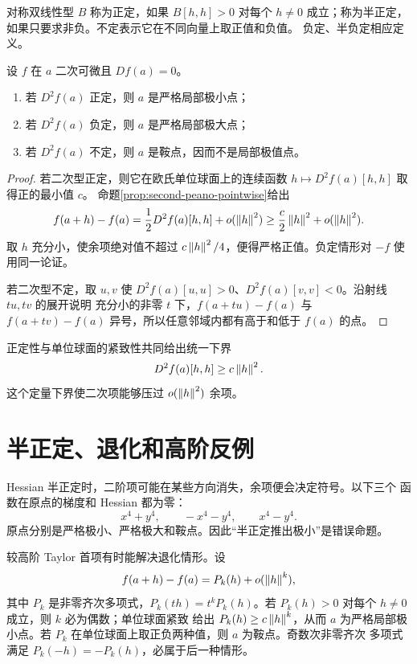 对称双线性型 \(B\) 称为正定，如果 \(B[h,h]>0\) 对每个 \(h\ne0\)
成立；称为半正定，如果只要求非负。不定表示它在不同向量上取正值和负值。
负定、半负定相应定义。

\begin{theorem}[Hessian 判别]
\label{thm:hessian-second-derivative-test}
设 \(f\) 在 \(a\) 二次可微且 \(Df(a)=0\)。
\begin{enumerate}[label=\textup{(\roman*)}]
 \item 若 \(D^2f(a)\) 正定，则 \(a\) 是严格局部极小点；
 \item 若 \(D^2f(a)\) 负定，则 \(a\) 是严格局部极大点；
 \item 若 \(D^2f(a)\) 不定，则 \(a\) 是鞍点，因而不是局部极值点。
\end{enumerate}
\end{theorem}

\begin{proof}
若二次型正定，则它在欧氏单位球面上的连续函数
\(h\mapsto D^2f(a)[h,h]\) 取得正的最小值 \(c\)。
命题\ref{prop:second-peano-pointwise}给出
\[
 f(a+h)-f(a)
 =\frac12D^2f(a)[h,h]+o(\left\lVert h\right\rVert^2)
 \ge\frac c2\left\lVert h\right\rVert^2+o(\left\lVert h\right\rVert^2).
\]
取 \(h\) 充分小，使余项绝对值不超过
\(c\left\lVert h\right\rVert^2/4\)，便得严格正值。负定情形对 \(-f\) 使用同一论证。

若二次型不定，取 \(u,v\) 使
\(D^2f(a)[u,u]>0\)、\(D^2f(a)[v,v]<0\)。沿射线 \(tu,tv\) 的展开说明
充分小的非零 \(t\) 下，\(f(a+tu)-f(a)\) 与
\(f(a+tv)-f(a)\) 异号，所以任意邻域内都有高于和低于 \(f(a)\) 的点。
\end{proof}

正定性与单位球面的紧致性共同给出统一下界
\[
 D^2f(a)[h,h]\ge c\left\lVert h\right\rVert^2.
\]
这个定量下界使二次项能够压过 $o(\left\lVert h\right\rVert^2)$ 余项。

\section{半正定、退化和高阶反例}

Hessian 半正定时，二阶项可能在某些方向消失，余项便会决定符号。以下三个
函数在原点的梯度和 Hessian 都为零：
\[
 x^4+y^4,
 \qquad
 -x^4-y^4,
 \qquad
 x^4-y^4.
\]
原点分别是严格极小、严格极大和鞍点。因此“半正定推出极小”是错误命题。

较高阶 Taylor 首项有时能解决退化情形。设
\[
 f(a+h)-f(a)=P_k(h)+o(\left\lVert h\right\rVert^k),
\]
其中 \(P_k\) 是非零齐次多项式，\(P_k(th)=t^kP_k(h)\)。若
\(P_k(h)>0\) 对每个 \(h\ne0\) 成立，则 \(k\) 必为偶数；单位球面紧致
给出 \(P_k(h)\ge c\left\lVert h\right\rVert^k\)，从而 \(a\) 为严格局部极小点。若
\(P_k\) 在单位球面上取正负两种值，则 \(a\) 为鞍点。奇数次非零齐次
多项式满足 \(P_k(-h)=-P_k(h)\)，必属于后一种情形。

